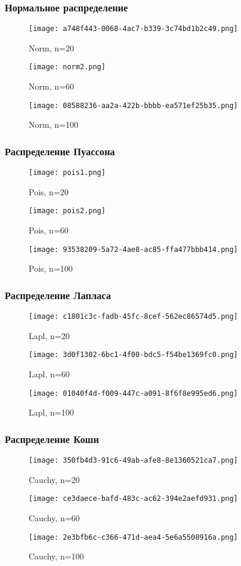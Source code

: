 \subsubsection{Нормальное распределение}
\begin{figure}[!htb]
  \texttt{[image: a748f443-0068-4ac7-b339-3c74bd1b2c49.png]}
  \caption{Norm, n=20}
\endminipage\hfill
{}
  \texttt{[image: norm2.png]}
  \caption{Norm, n=60}
\endminipage\hfill
{}
  \texttt{[image: 08588236-aa2a-422b-bbbb-ea571ef25b35.png]}
  \caption{Norm, n=100}
\endminipage
 \label{fig:norm}
\end{figure}
\newpage
\subsubsection{Распределение Пуассона}
\begin{figure}[!htb]
  \texttt{[image: pois1.png]}
  \caption{Pois, n=20}
\endminipage\hfill
{}
  \texttt{[image: pois2.png]}
  \caption{Pois, n=60}
\endminipage\hfill
{}
  \texttt{[image: 93538209-5a72-4ae8-ac85-ffa477bbb414.png]}
  \caption{Pois, n=100}
\endminipage
 \label{fig:pois}
\end{figure}
\newpage
\subsubsection{Распределение Лапласа}
\begin{figure}[!htb]
  \texttt{[image: c1801c3c-fadb-45fc-8cef-562ec86574d5.png]}
  \caption{Lapl, n=20}
\endminipage\hfill
{}
  \texttt{[image: 3d0f1302-6bc1-4f00-bdc5-f54be1369fc0.png]}
  \caption{Lapl, n=60}
\endminipage\hfill
{}
  \texttt{[image: 01040f4d-f009-447c-a091-8f6f8e995ed6.png]}
  \caption{Lapl, n=100}
\endminipage
 \label{fig:lapl}
\end{figure}
\newpage
\subsubsection{Распределение Коши}
\begin{figure}[!htb]
  \texttt{[image: 350fb4d3-91c6-49ab-afe8-8e1360521ca7.png]}
  \caption{Cauchy, n=20}
\endminipage\hfill
{}
  \texttt{[image: ce3daece-bafd-483c-ac62-394e2aefd931.png]}
  \caption{Cauchy, n=60}
\endminipage\hfill
{}
  \texttt{[image: 2e3bfb6c-c366-471d-aea4-5e6a5508916a.png]}
  \caption{Cauchy, n=100}
\endminipage
 \label{fig:cauchy}
\end{figure}
\newpage
